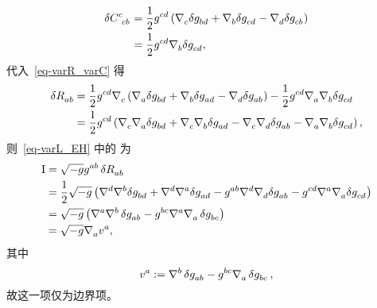 \begin{Proof}
\begin{equation}
\begin{split}
					\var{\tensor{C}{^c_c_b}} &= \frac{1}{2} \tensor{g}{^c^d} \left( \Nabla{c} \var \tensor{g}{_b_d} + \Nabla{b} \var \tensor{g}{_c_d} - \Nabla{d} \var \tensor{g}{_c_b} \right)\\
					&= \frac{1}{2} \tensor{g}{^c^d} \Nabla{b} \var \tensor{g}{_c_d},
				\end{split}
			\end{equation}
			代入~\eqref{eq-varR_varC} 得
			\begin{equation}
				\begin{split}
					\var{\tensor{R}{_a_b}} &= \frac{1}{2} \tensor{g}{^c^d} \Nabla{c} \left( \Nabla{a} \var \tensor{g}{_b_d} + \Nabla{b} \var \tensor{g}{_a_d} - \Nabla{d} \var \tensor{g}{_a_b} \right) - \frac{1}{2} \tensor{g}{^c^d} \Nabla{a} \Nabla{b} \var \tensor{g}{_c_d}\\
					&= \frac{1}{2} \tensor{g}{^c^d} \left( \Nabla{c} \Nabla{a} \var \tensor{g}{_b_d} + \Nabla{c} \Nabla{b} \var \tensor{g}{_a_d} - \Nabla{c} \Nabla{d} \var \tensor{g}{_a_b} - \Nabla{a} \Nabla{b} \var \tensor{g}{_c_d} \right),
				\end{split}
			\end{equation}
			则~\eqref{eq-varL_EH} 中的  为
			\begin{equation}
				\begin{split}
					\RomanNumeralCaps{1} &= \sqrt{-g} \tensor{g}{^a^b} \var{\tensor{R}{_a_b}}\\
					&= \frac{1}{2} \sqrt{-g} \left( \tensor{\nabla}{^d} \tensor{\nabla}{^b} \var \tensor{g}{_b_d} + \tensor{\nabla}{^d} \tensor{\nabla}{^a} \var \tensor{g}{_a_d} - \tensor{g}{^a^b} \tensor{\nabla}{^d} \Nabla{d} \var \tensor{g}{_a_b} - \tensor{g}{^c^d} \tensor{\nabla}{^a} \Nabla{a} \var \tensor{g}{_c_d} \right)\\
					&= \sqrt{-g} \left( \tensor{\nabla}{^a} \tensor{\nabla}{^b} \var{\tensor{g}{_a_b}} - \tensor{g}{^b^c} \tensor{\nabla}{^a} \Nabla{a} \var{\tensor{g}{_b_c}} \right)\\
					&= \sqrt{-g} \Nabla{a} \tensor{v}{^a},
				\end{split}
			\end{equation}
			其中
			\begin{equation}
				\tensor{v}{^a} \definedby \tensor{\nabla}{^b} \var{\tensor{g}{_a_b}} - \tensor{g}{^b^c} \Nabla{a} \var{\tensor{g}{_b_c}},
			\end{equation}
			故这一项仅为边界项。


\end{Proof}
